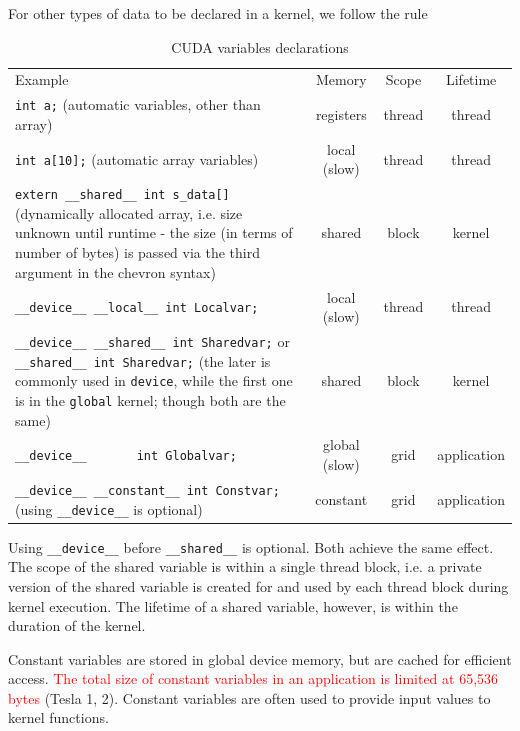 For other types of data to be declared in a kernel, we follow the rule
\begin{table}[hbt]
  \begin{center}
    \caption{CUDA variables declarations}
    \begin{tabular}{p{7cm}ccc} 
      \hline
      Example & Memory & Scope & Lifetime \\ 
      \verb!int a;! (automatic variables, other than array) & registers &
      thread & thread \\
      \verb!int a[10];! (automatic array variables) & local (slow) & thread &
      thread \\
      \verb!extern __shared__ int s_data[]! (dynamically allocated
      array, i.e. size unknown until
      runtime - the size (in terms of number of bytes) is passed via
      the third argument in the chevron syntax) & shared & block &
      kernel \\
      \verb!__device__ __local__ int Localvar;! & local (slow) & thread & thread \\
      \verb!__device__ __shared__ int Sharedvar;! or 
      \verb!__shared__ int Sharedvar;! (the later is commonly used in \verb!device!,
      while the first one is in the \verb!global! kernel; though both
      are the same) & shared & block & kernel
      \\
      \verb!__device__       int Globalvar;! & global (slow) & grid & application
      \\
      \verb!__device__ __constant__ int Constvar;! (using
      \verb!__device__! is optional)  & constant  & grid &
      application \\
      \hline\hline
    \end{tabular}
  \end{center}
  \label{tab:CUDA_variables}
\end{table}

\begin{framed}
  Using \verb!__device__! before \verb!__shared__! is optional. Both
  achieve the same effect. The scope of the shared variable is within
  a single thread block, i.e. a private version of the shared variable
  is created for and used by each thread block during kernel
  execution. The lifetime of a shared variable, however, is within the
  duration of the kernel. 
\end{framed}

\begin{framed}
  Constant variables are stored in global device memory, but are
  cached for efficient access. \textcolor{red}{The total size of
    constant variables in an application is limited at 65,536 bytes}
  (Tesla 1, 2). Constant variables are often used to provide input
  values to kernel functions. 
\end{framed}

